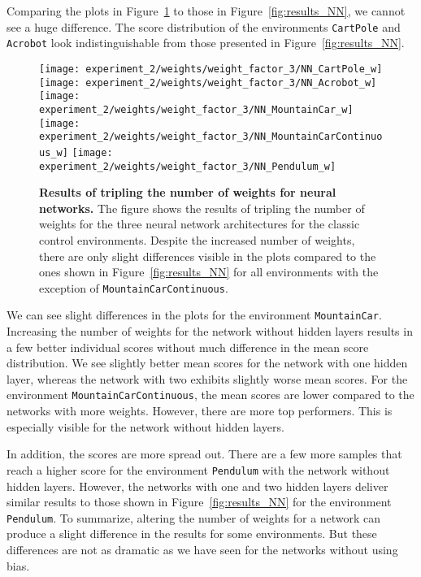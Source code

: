 Comparing the plots in Figure~\ref{fig:results_NN_weights} to those in Figure~\ref{fig:results_NN}, we cannot see a huge difference. The score distribution of the environments \verb|CartPole| and \verb|Acrobot| look indistinguishable from those presented in Figure~\ref{fig:results_NN}.
\begin{figure}[!ht]
  \centering
\texttt{[image: experiment\_2/weights/weight\_factor\_3/NN\_CartPole\_w]}
\texttt{[image: experiment\_2/weights/weight\_factor\_3/NN\_Acrobot\_w]}
\texttt{[image: experiment\_2/weights/weight\_factor\_3/NN\_MountainCar\_w]}
\texttt{[image: experiment\_2/weights/weight\_factor\_3/NN\_MountainCarContinuous\_w]}
\texttt{[image: experiment\_2/weights/weight\_factor\_3/NN\_Pendulum\_w]}
\caption[Results of tripling the number of weights for neural networks]{
  \textbf{Results of tripling the number of weights for neural networks.}
   The figure shows the results of tripling the number of weights for the three neural network architectures for the classic control environments. Despite the increased number of weights, there are only slight differences visible in the plots compared to the ones shown in Figure~\ref{fig:results_NN} for all environments with the exception of \texttt{MountainCarContinuous}.
}
\label{fig:results_NN_weights}
\end{figure}
We can see slight differences in the plots for the environment \verb|MountainCar|. Increasing the number of weights for the network without hidden layers results in a few better individual scores without much difference in the mean score distribution. We see slightly better mean scores for the network with one hidden layer, whereas the network with two exhibits slightly worse mean scores. For the environment \verb|MountainCarContinuous|, the mean scores are lower compared to the networks with more weights. However, there are more top performers.  This is especially visible for the network without hidden layers.

In addition, the scores are more spread out. There are a few more samples that reach a higher score for the environment \verb|Pendulum| with the network without hidden layers. However, the networks with one and two hidden layers deliver similar results to those shown in Figure~\ref{fig:results_NN} for the environment \verb|Pendulum|. To summarize, altering the number of weights for a network can produce a slight difference in the results for some environments. But these differences are not as dramatic as we have seen for the networks without using bias.

